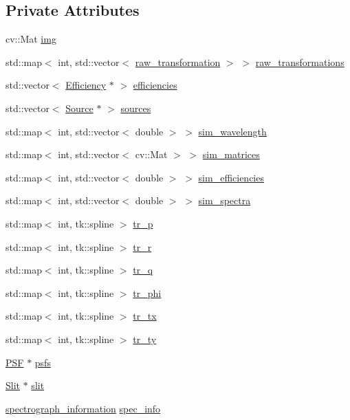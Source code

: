 \subsection*{Private Attributes}
\begin{DoxyCompactItemize}
\item 
cv\+::\+Mat \hyperlink{class_matrix_simulator_a90bcc13f784a69c54ad605ef77dcbbe8}{img}
\item 
std\+::map$<$ int, std\+::vector$<$ \hyperlink{structraw__transformation}{raw\+\_\+transformation} $>$ $>$ \hyperlink{class_matrix_simulator_a1266c67228a0fc2c1387c4e7454fe435}{raw\+\_\+transformations}
\item 
std\+::vector$<$ \hyperlink{class_efficiency}{Efficiency} $\ast$ $>$ \hyperlink{class_matrix_simulator_a05c00fb5164a5faa987da2642b899035}{efficiencies}
\item 
std\+::vector$<$ \hyperlink{class_source}{Source} $\ast$ $>$ \hyperlink{class_matrix_simulator_abb3bc16d0336f6bbda99300ceccdf427}{sources}
\item 
std\+::map$<$ int, std\+::vector$<$ double $>$ $>$ \hyperlink{class_matrix_simulator_aac8850d4461c6a7775dc44f6bdafb2e2}{sim\+\_\+wavelength}
\item 
std\+::map$<$ int, std\+::vector$<$ cv\+::\+Mat $>$ $>$ \hyperlink{class_matrix_simulator_a4886dd70ef084bd73bb224c7f28897ee}{sim\+\_\+matrices}
\item 
std\+::map$<$ int, std\+::vector$<$ double $>$ $>$ \hyperlink{class_matrix_simulator_a6202de105f6c949a226b98bb048560c1}{sim\+\_\+efficiencies}
\item 
std\+::map$<$ int, std\+::vector$<$ double $>$ $>$ \hyperlink{class_matrix_simulator_aa3ddf31246c9f2be64ab12fe4b47e8af}{sim\+\_\+spectra}
\item 
std\+::map$<$ int, tk\+::spline $>$ \hyperlink{class_matrix_simulator_a8f9852337a1ab80f532ff69ae2b41b3b}{tr\+\_\+p}
\item 
std\+::map$<$ int, tk\+::spline $>$ \hyperlink{class_matrix_simulator_a52d4a39c875373d76c0f7b9baf5f1e2f}{tr\+\_\+r}
\item 
std\+::map$<$ int, tk\+::spline $>$ \hyperlink{class_matrix_simulator_a18bb49a4ca4363acce7e33382d578edb}{tr\+\_\+q}
\item 
std\+::map$<$ int, tk\+::spline $>$ \hyperlink{class_matrix_simulator_ac892d19d1c68c6414b9a3c999205092b}{tr\+\_\+phi}
\item 
std\+::map$<$ int, tk\+::spline $>$ \hyperlink{class_matrix_simulator_aa544354356e00fe4da0edcb30f37e6b4}{tr\+\_\+tx}
\item 
std\+::map$<$ int, tk\+::spline $>$ \hyperlink{class_matrix_simulator_a3d7f3962f4b2d2de111bc00539e0ba68}{tr\+\_\+ty}
\item 
\hyperlink{class_p_s_f}{P\+SF} $\ast$ \hyperlink{class_matrix_simulator_a4f8b1a0772c43203f1b06420c0d018fa}{psfs}
\item 
\hyperlink{class_slit}{Slit} $\ast$ \hyperlink{class_matrix_simulator_a5b054ede1af3c6e29296af6f2cd5e313}{slit}
\item 
\hyperlink{structspectrograph__information}{spectrograph\+\_\+information} \hyperlink{class_matrix_simulator_a3a1e3511ea01199d625b19f4add87b75}{spec\+\_\+info}
\end{DoxyCompactItemize}


